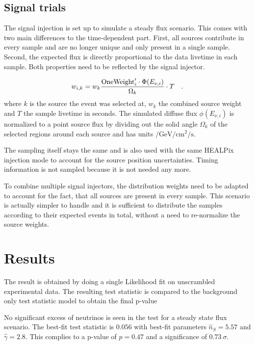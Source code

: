 \subsection*{Signal trials}
The signal injection is set up to simulate a steady flux scenario.
This comes with two main differences to the time-dependent part.
First, all sources contribute in every sample and are no longer unique and only present in a single sample.
Second, the expected flux is directly proportional to the data livetime in each sample.
Both properties need to be reflected by the signal injector.

\begin{equation}
  w_{i,k} = w_k \frac{\text{OneWeight}'_i \cdot
    \Phi(E_{\nu,i})}{\Omega_k} \cdot T
  \quad\text{.}
\end{equation}
where $k$ is the source the event was selected at, $w_k$ the combined source weight and $T$ the sample livetime in seconds.
The simulated diffuse flux $\phi(E_{\nu,i})$ is normalized to a point source flux by dividing out the solid angle $\Omega_k$ of the selected regions around each source and has units $\si{\per\GeV\per\cm\squared\per\second}$.

The sampling itself stays the same and is also used with the same HEALPix injection mode to account for the source position uncertainties.
Timing information is not sampled because it is not needed any more.

To combine multiple signal injectors, the distribution weights need to be adapted to account for the fact, that all sources are present in every sample.
This scenario is actually simpler to handle and it is sufficient to distribute the samples according to their expected events in total, without a need to re-normalize the source weights.


\section{Results}
The result is obtained by doing a single Likelihood fit on unscrambled experimental data.
The resulting test statistic is compared to the background only test statistic model to obtain the final p-value

No significant excess of neutrinos is seen in the test for a steady state flux scenario.
The best-fit test statistic is $\num{0.056}$ with best-fit parameters $\hat{n}_S = \num{5.57}$ and $\hat{\gamma} = \num{2.8}$.
This complies to a p-value of $p=0.47$ and a significance of $\SI{0.73}{\sigma}$.
